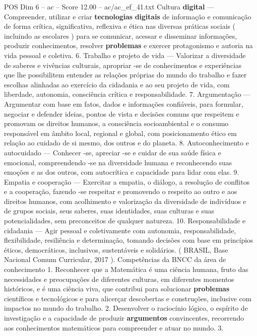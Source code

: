 \begin{textsample}{POS Dim 6 – ac – Score 12.00 – ac/ac\_ef\_41.txt}
Cultura \textbf{digital} — Compreender, utilizar e criar \textbf{tecnologias} \textbf{digitais} de informação e comunicação de forma crítica, significativa, reflexiva e ética nas diversas práticas sociais ( incluindo as escolares ) para se comunicar, acessar e disseminar informações, produzir conhecimentos, resolver \textbf{problemas} e exercer protagonismo e autoria na vida pessoal e coletiva. 6.
Trabalho e projeto de vida — Valorizar a diversidade de saberes e vivências culturais, apropriar -se de conhecimentos e experiências que lhe possibilitem entender as relações próprias do mundo do trabalho e fazer escolhas alinhadas ao exercício da cidadania e ao seu projeto de vida, com liberdade, autonomia, consciência crítica e responsabilidade. 7.
Argumentação — Argumentar com base em fatos, dados e informações confiáveis, para formular, negociar e defender ideias, pontos de vista e decisões comuns que respeitem e promovam os direitos humanos, a consciência socioambiental e o consumo responsável em âmbito local, regional e global, com posicionamento ético em relação ao cuidado de si mesmo, dos outros e do planeta. 8.
Autoconhecimento e autocuidado — Conhecer -se, apreciar -se e cuidar de sua saúde física e emocional, compreendendo -se na diversidade humana e reconhecendo suas emoções e as dos outros, com autocrítica e capacidade para lidar com elas. 9.
Empatia e cooperação — Exercitar a empatia, o diálogo, a resolução de conflitos e a cooperação, fazendo -se respeitar e promovendo o respeito ao outro e aos direitos humanos, com acolhimento e valorização da diversidade de indivíduos e de grupos sociais, seus saberes, suas identidades, suas culturas e suas potencialidades, sem preconceitos de qualquer natureza. 10.
Responsabilidade e cidadania — Agir pessoal e coletivamente com autonomia, responsabilidade, flexibilidade, resiliência e determinação, tomando decisões com base em princípios éticos, democráticos, inclusivos, sustentáveis e solidários. ( BRASIL, Base Nacional Comum Curricular, 2017 ).
Competências da BNCC da área de conhecimento 1.
Reconhecer que a Matemática é uma ciência humana, fruto das necessidades e preocupações de diferentes culturas, em diferentes momentos históricos, e é uma ciência viva, que contribui para solucionar \textbf{problemas} científicos e tecnológicos e para alicerçar descobertas e construções, inclusive com impactos no mundo do trabalho. 2.
Desenvolver o raciocínio lógico, o espírito de investigação e a capacidade de produzir \textbf{argumentos} convincentes, recorrendo aos conhecimentos matemáticos para compreender e atuar no mundo. 3.

\end{textsample}
